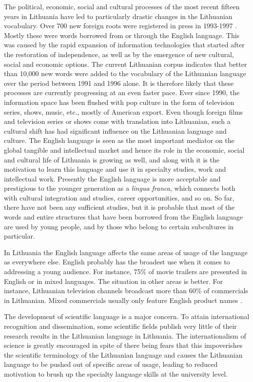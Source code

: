 \begin{multicols}{2}
The political, economic, social and cultural processes of the most recent fifteen years in Lithuania have led to particularly drastic changes in the Lithuanian vocabulary. Over 700 new foreign roots were registered in press in 1993-1997 \cite{nbi1}.  Mostly these were words borrowed from or through the English language. This was caused by the rapid expansion of information technologies that started after the restoration of independence, as well as by the emergence of new cultural, social and economic options. The current Lithuanian corpus indicates that better than 10,000 new words were added to the vocabulary of the Lithuanian language over the period between 1991 and 1996 alone. It is therefore likely that these processes are currently progressing at an even faster pace. 
Ever since 1990, the information space has been flushed with pop culture in the form of television series, shows, music, etc., mostly of American export. Even though foreign films and television series or shows come with translation into Lithuanian, such a cultural shift has had significant influence on the Lithuanian language and culture. The English language is seen as the most important mediator on the global tangible and intellectual market and hence its role in the economic, social and cultural life of Lithuania is growing as well, and along with it is the motivation to learn this language and use it in specialty studies, work and intellectual work. Presently the English language is more acceptable and prestigious to the younger generation as a \textit{lingua franca}, which connects both with cultural integration and studies, career opportunities, and so on. So far, there have not been any sufficient studies, but it is probable that most of the words and entire structures that have been borrowed from the English language are used by young people, and by those who belong to certain subcultures in particular.

In Lithuania the English language affects the same areas of usage of the language as everywhere else. English probably has the broadest use when it comes to addressing a young audience. For instance, 75\% of movie trailers are presented in English or in mixed languages. The situation in other areas is better. For instance, Lithuanian television channels broadcast more than 60\% of commercials in Lithuanian. Mixed commercials usually only feature English product names \cite{nbi1}.

The development of scientific language is a major concern. To attain international recognition and dissemination, some scientific fields publish very little of their research results in the Lithuanian language in Lithuania. The internationalism of science is greatly encouraged in spite of there being fears that this impoverishes the scientific terminology of the Lithuanian language and causes the Lithuanian language to be pushed out of specific areas of usage, leading to reduced motivation to brush up the specialty language skills at the university level.


\end{multicols}
